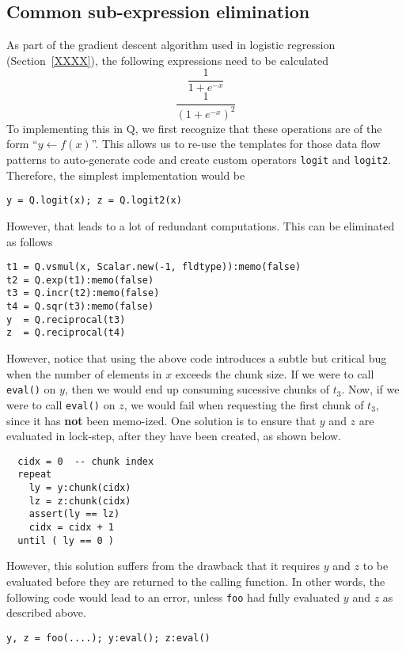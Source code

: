 \subsection{Common sub-expression elimination}

As part of the gradient descent algorithm used in logistic regression
(Section~\ref{XXXX}), the following expressions need to be
calculated 
\begin{equation}
\label{logit}
  \frac{1}{1 + e^{-x}}
\end{equation}
\begin{equation}
\label{logit2}
    \frac{1}{(1 + e^{-x})^2}
\end{equation}
To implementing this in Q, we first 
recognize that these operations are of the form ``\(y \leftarrow f(x)\)''. This
allows us to re-use the templates for those data flow patterns to auto-generate
code and create 
custom operators {\tt logit} and {\tt logit2}. 
Therefore, the simplest implementation would be
\begin{verbatim}
y = Q.logit(x); z = Q.logit2(x)
\end{verbatim}
However, that leads to a lot
of redundant computations.  This can be eliminated as follows
\begin{verbatim}
t1 = Q.vsmul(x, Scalar.new(-1, fldtype)):memo(false)
t2 = Q.exp(t1):memo(false)
t3 = Q.incr(t2):memo(false)
t4 = Q.sqr(t3):memo(false)
y  = Q.reciprocal(t3)
z  = Q.reciprocal(t4)
\end{verbatim}

However, notice that using the above code introduces a subtle but
critical bug when the number of elements in \(x\) exceeds the chunk
size.  If we were to call {\tt eval()} on \(y\), then we would
end up consuming sucessive chunks of \(t_3\). Now, if we were to call
{\tt eval()} on \(z\), we would fail when requesting the first
chunk of \(t_3\), since it has {\bf not} been memo-ized. One solution
is to ensure that \(y\) and \(z\) are evaluated in lock-step, after they have
been created, as shown below.
\begin{verbatim} 
  cidx = 0  -- chunk index
  repeat 
    ly = y:chunk(cidx)
    lz = z:chunk(cidx)
    assert(ly == lz)
    cidx = cidx + 1
  until ( ly == 0 )
\end{verbatim}

However, this solution suffers from the drawback that it requires \(y\) and
\(z\) to be evaluated before they are returned to the calling function.
In other words, the following code would lead to an error, unless {\tt foo} had
fully evaluated \(y\) and \(z\) as described above.
\begin{verbatim}
y, z = foo(....); y:eval(); z:eval()
\end{verbatim}

